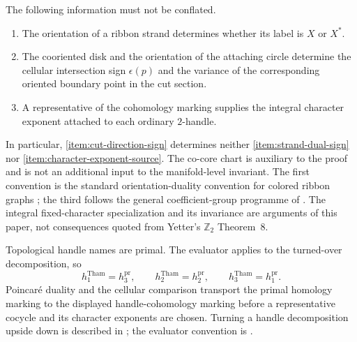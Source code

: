 \begin{convention}
\label{conv:three-sign-sources}
The following information must not be conflated.
\begin{enumerate}[label=(\roman*),ref=\roman*]
  \item\label{item:strand-dual-sign}
  The orientation of a ribbon strand determines whether its label is $X$ or
  $X^*$.

  \item\label{item:cut-direction-sign}
  The cooriented disk and the orientation of the attaching circle determine
  the cellular intersection sign $\epsilon(p)$ and the variance of the
  corresponding oriented boundary point in the cut section.

  \item\label{item:character-exponent-source}
  A representative of the cohomology marking supplies the integral character
  exponent attached to each ordinary $2$-handle.
\end{enumerate}
In particular, \cref{item:cut-direction-sign} determines neither
\cref{item:strand-dual-sign} nor \cref{item:character-exponent-source}.
The co-core chart is auxiliary to the proof and is not an additional input to
the manifold-level invariant.
The first convention is the standard orientation-duality convention for
colored ribbon graphs \cite[Chapter~2, Section~2.2]{BakalovKirillov2001};
the third follows the general coefficient-group programme of
\cite[pp.~2--3 and Definitions~1 and~3]{Yetter1993}.  The integral
fixed-character specialization and its invariance are arguments of this
paper, not consequences quoted from Yetter's $\mathbb Z_2$ Theorem~8.
\end{convention}

\begin{convention}
\label{conv:primal-turned-over}
Topological handle names are primal.  The evaluator applies
\cite[Definition~5.11]{Tham2021} to the turned-over decomposition, so
\[
  h^{\mathrm{Tham}}_1=h^{\mathrm{pr}}_3,
  \qquad h^{\mathrm{Tham}}_2=h^{\mathrm{pr}}_2,
  \qquad h^{\mathrm{Tham}}_3=h^{\mathrm{pr}}_1.
\]
Poincar\'e duality and the cellular comparison transport the primal homology
marking to the displayed handle-cohomology marking before a representative
cocycle and its character exponents are chosen.  Turning a handle
decomposition upside down is
described in \cite[Section~4.2]{GompfStipsicz1999}; the evaluator convention
is \cite[Definition~5.11]{Tham2021}.
\end{convention}


